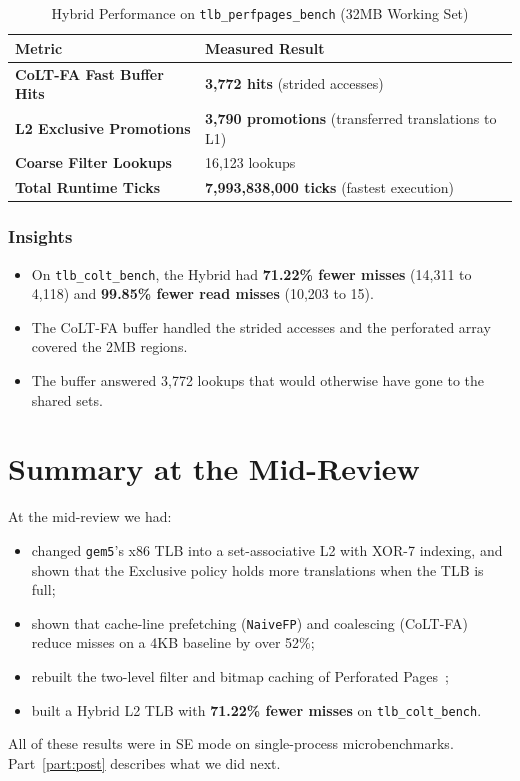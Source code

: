 \begin{table}[H]
\centering
\small
\caption{Hybrid Performance on \texttt{tlb\_perfpages\_bench} (32MB Working Set)}
\label{tab:grand_hybrid_perf}
\begin{tabularx}{\textwidth}{lX}
\toprule
\textbf{Metric} & \textbf{Measured Result} \\
\midrule
\textbf{CoLT-FA Fast Buffer Hits} & \textbf{3,772 hits} (strided accesses) \\
\textbf{L2 Exclusive Promotions} & \textbf{3,790 promotions} (transferred translations to L1) \\
\textbf{Coarse Filter Lookups} & 16,123 lookups \\
\textbf{Total Runtime Ticks} & \textbf{7,993,838,000 ticks} (fastest execution) \\
\bottomrule
\end{tabularx}
\end{table}

\subsubsection{Insights}
\begin{itemize}
    \item On \texttt{tlb\_colt\_bench}, the Hybrid had \textbf{71.22\% fewer misses} (14,311 to 4,118) and \textbf{99.85\% fewer read misses} (10,203 to 15).
    \item The CoLT-FA buffer handled the strided accesses and the perforated array covered the 2MB regions.
    \item The buffer answered 3,772 lookups that would otherwise have gone to the shared sets.
\end{itemize}

\section{Summary at the Mid-Review}
At the mid-review we had:
\begin{itemize}
    \item changed \texttt{gem5}'s x86 TLB into a set-associative L2 with XOR-7 indexing, and shown that the Exclusive policy holds more translations when the TLB is full;
    \item shown that cache-line prefetching (\texttt{NaiveFP}) and coalescing (CoLT-FA)~\cite{pham2012colt} reduce misses on a 4KB baseline by over 52\%;
    \item rebuilt the two-level filter and bitmap caching of Perforated Pages~\cite{kwon2020perforated};
    \item built a Hybrid L2 TLB with \textbf{71.22\% fewer misses} on \texttt{tlb\_colt\_bench}.
\end{itemize}
All of these results were in SE mode on single-process microbenchmarks. Part~\ref{part:post} describes what we did next.
